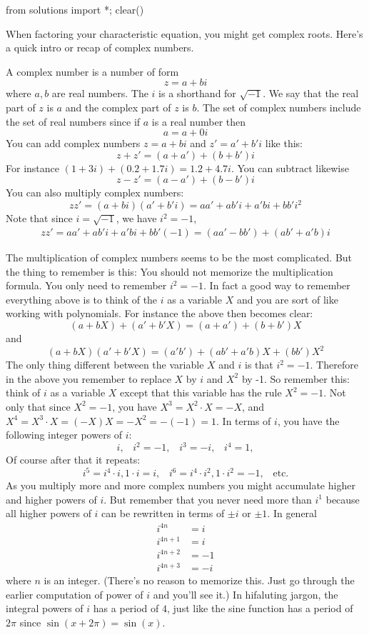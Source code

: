 \begin{python0}
from solutions import *; clear() 
\end{python0}

When factoring your characteristic equation, you might get
complex roots.
Here's a quick intro or recap of complex numbers.

A complex number is a number of form
\[
z = a + bi
\]
where $a, b$ are real numbers.
The $i$ is a shorthand for $\sqrt{-1}$.
We say that the real part of $z$ is $a$ and the complex part of $z$ is $b$.
The set of complex numbers include the set of real numbers since
if $a$ is a real number then
\[
a = a + 0i
\]
You can add complex numbers $z = a + bi$ and $z' = a' + b'i$ like this:
\[
z + z' = (a+a') + (b+b')i
\]
For instance $(1+3i) + (0.2 + 1.7i) = 1.2 + 4.7i$. 
You can subtract likewise
\[
z - z' = (a-a') + (b-b')i
\]
You can also multiply complex numbers:
\[
zz' = (a + bi)(a' + b'i) = aa' + ab'i + a'bi + bb'i^2
\]
Note that since $i = \sqrt{-1}$, we have $i^2 = -1$,
\begin{align*}
zz' = aa' + ab'i + a'bi + bb'(-1) = (aa' - bb') + (ab' + a'b)i
\end{align*}

The multiplication of complex numbers seems to be the most complicated.
But the thing to remember is this:
You should not memorize the multiplication formula.
You only need to remember $i^2 = -1$.
In fact a good way to remember everything above is to think of the
$i$ as a variable $X$ and you are sort of like working with
polynomials.
For instance the above then becomes clear:
\[
(a + bX) + (a' + b'X) = (a+a') + (b + b')X
\]
and
\[
(a + bX) (a' + b'X) = (a'b') + (ab' + a'b)X + (bb')X^2
\]
The only thing different between the variable $X$ and $i$ is
that $i^2 = -1$.
Therefore in the above you remember to replace $X$ by $i$ and
$X^2$ by -1.
So remember this: think of $i$ as a variable $X$ except that this
variable has the rule $X^2 = -1$.
Not only that since $X^2 = -1$, you have $X^3 = X^2 \cdot X = -X$,
and $X^4 = X^3 \cdot X = (-X)X = -X^2 = -(-1) = 1$.
In terms of $i$, you have the following integer powers of $i$:
\[
i, \,\,\,\,\,
i^2 = -1, \,\,\,\,\,
i^3 = -i, \,\,\,\,\,
i^4 = 1, 
\]
Of course after that it repeats:
\[
i^5 = i^4 \cdot i, 1 \cdot i = i, \,\,\,\,\,
i^6 = i^4 \cdot i^2, 1 \cdot i^2 = -1, \,\,\,\,\,
\text{etc.}
\]
As you multiply more and more complex numbers you might accumulate
higher and higher powers of $i$.
But remember that you never need more than $i^1$
because all higher powers of $i$ can be rewritten in terms of $\pm i$ or 
$\pm 1$.
In general
\begin{align*}
i^{4n} &= i \\
i^{4n+1} &= i \\
i^{4n+2} &= -1 \\
i^{4n+3} &= -i
\end{align*}
where $n$ is an integer.
(There's no reason to memorize this. 
Just go through the earlier computation of power of $i$ and you'll see it.)
In hifaluting jargon, the integral powers of $i$ has a period of $4$,
just like the sine function has a period of $2\pi$ since
$\sin(x + 2\pi) = \sin(x)$.

